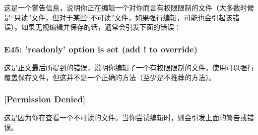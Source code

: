 这是一个警告信息，说明你正在编辑一个对你而言有权限限制的文件（大多数时候是“只读”文件，但对于某些“不可读”文件，如果强行编辑，可能也会引起该错误）。如果无视编辑并保存的话，通常会引发下面的错误：

\subsubsection{E45: 'readonly' option is set (add ! to override) }

这是正文最后所提到的错误，说明你编辑了一个有权限限制的文件。使用可以强行覆盖保存文件，但这并不是一个正确的方法（至少是不推荐的方法）。

\subsubsection{ [Permission Denied] }

这是因为你在查看一个不可读的文件。当你尝试编辑时，则会引发上面的警告或错误。